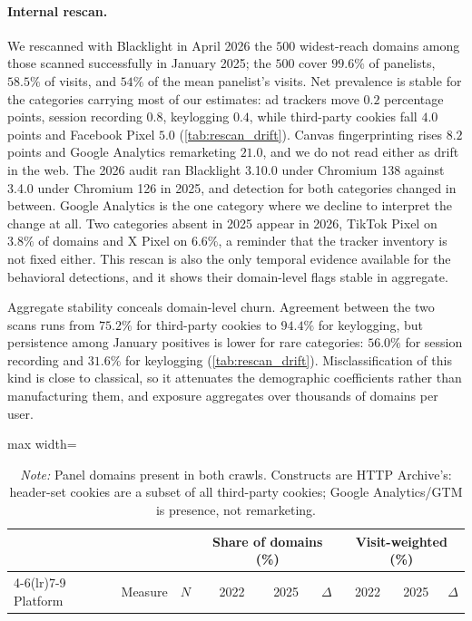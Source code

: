 \documentclass[12pt, letterpaper]{article}
\begin{document}
\paragraph{Internal rescan.}
We rescanned with Blacklight in April 2026 the $500$ widest-reach domains among those scanned successfully in January 2025; the $500$ cover $99.6\%$ of panelists, $58.5\%$ of visits, and $54\%$ of the mean panelist's visits. Net prevalence is stable for the categories carrying most of our estimates: ad trackers move $0.2$ percentage points, session recording $0.8$, keylogging $0.4$, while third-party cookies fall $4.0$ points and Facebook Pixel $5.0$ (\cref{tab:rescan_drift}). Canvas fingerprinting rises $8.2$ points and Google Analytics remarketing $21.0$, and we do not read either as drift in the web. The 2026 audit ran Blacklight 3.10.0 under Chromium 138 against 3.4.0 under Chromium 126 in 2025, and detection for both categories changed in between. Google Analytics is the one category where we decline to interpret the change at all. Two categories absent in 2025 appear in 2026, TikTok Pixel on $3.8\%$ of domains and X Pixel on $6.6\%$, a reminder that the tracker inventory is not fixed either. This rescan is also the only temporal evidence available for the behavioral detections, and it shows their domain-level flags stable in aggregate.
 
Aggregate stability conceals domain-level churn. Agreement between the two scans runs from $75.2\%$ for third-party cookies to $94.4\%$ for keylogging, but persistence among January positives is lower for rare categories: $56.0\%$ for session recording and $31.6\%$ for keylogging (\cref{tab:rescan_drift}). Misclassification of this kind is close to classical, so it attenuates the demographic coefficients rather than manufacturing them, and exposure aggregates over thousands of domains per user.

\begin{table}[ht]
\centering
\caption{Same-instrument tracking drift on panel domains, June 2022 to June 2025 (HTTP Archive)}
\label{tab:httparchive_drift}
\begin{adjustbox}{max width=\textwidth}
\begin{tabular}{llrrrrrrr}
\toprule
& & & \multicolumn{3}{c}{Share of domains (\%)} & \multicolumn{3}{c}{Visit-weighted (\%)} \\
\cmidrule(lr){4-6}\cmidrule(lr){7-9}
Platform & Measure & $N$ & 2022 & 2025 & $\Delta$ & 2022 & 2025 & $\Delta$ \\
\midrule

\bottomrule
\end{tabular}
\end{adjustbox}
\caption*{\textit{Note:} Panel domains present in both crawls. Constructs are HTTP Archive's: header-set cookies are a subset of all third-party cookies; Google Analytics/GTM is presence, not remarketing.}
\end{table}
\end{document}
